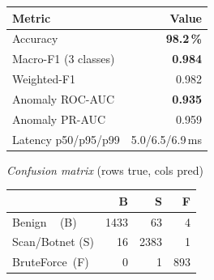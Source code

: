 \documentclass[11pt,a4paper]{article}
\begin{document}
\begin{minipage}[t]{0.46\textwidth}
\centering
\small
\renewcommand{\arraystretch}{1.15}
\begin{tabular}{@{}lr@{}}
\toprule
\textbf{Metric} & \textbf{Value} \\
\midrule
Accuracy             & \textbf{98.2\,\%} \\
Macro-F1 (3 classes) & \textbf{0.984} \\
Weighted-F1          & 0.982 \\
\addlinespace
Anomaly ROC-AUC      & \textbf{0.935} \\
Anomaly PR-AUC       & 0.959 \\
\addlinespace
Latency p50/p95/p99  & 5.0/6.5/6.9\,ms \\
\bottomrule
\end{tabular}

\vspace{8pt}
{\small\textit{Confusion matrix} (rows true, cols pred)}\\[2pt]
\renewcommand{\arraystretch}{1.1}
\begin{tabular}{@{}l rrr@{}}
\toprule
 & B & S & F \\
\midrule
Benign\ \ \,(B)     & 1433 & 63 & 4 \\
Scan/Botnet (S)     & 16 & 2383 & 1 \\
BruteForce\ (F)     & 0 & 1 & 893 \\
\bottomrule
\end{tabular}
\end{minipage}
\hfill
\end{document}
